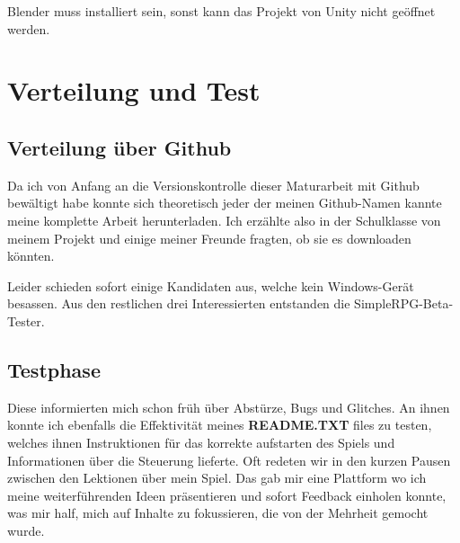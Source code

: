Blender muss installiert sein, sonst kann das Projekt von Unity nicht geöffnet werden.

\section{Verteilung und Test}

\subsection{Verteilung über Github}

Da ich von Anfang an die Versionskontrolle dieser Maturarbeit mit Github bewältigt habe konnte sich theoretisch jeder der meinen Github-Namen kannte meine komplette Arbeit herunterladen.\cite{csomormaturaarbeit19github}
Ich erzählte also in der Schulklasse von meinem Projekt und einige meiner Freunde fragten, ob sie es downloaden könnten.

Leider schieden sofort einige Kandidaten aus, welche kein Windows-Gerät besassen.
Aus den restlichen drei Interessierten entstanden die SimpleRPG-Beta-Tester.

\subsection{Testphase}

Diese informierten mich schon früh über Abstürze, Bugs und Glitches.
An ihnen konnte ich ebenfalls die Effektivität meines \textbf{README.TXT} files zu testen, welches ihnen Instruktionen für das korrekte aufstarten des Spiels und Informationen über die Steuerung lieferte.
Oft redeten wir in den kurzen Pausen zwischen den Lektionen über mein Spiel.
Das gab mir eine Plattform wo ich meine weiterführenden Ideen präsentieren und sofort Feedback einholen konnte, was mir half, mich auf Inhalte zu fokussieren, die von der Mehrheit gemocht wurde.


